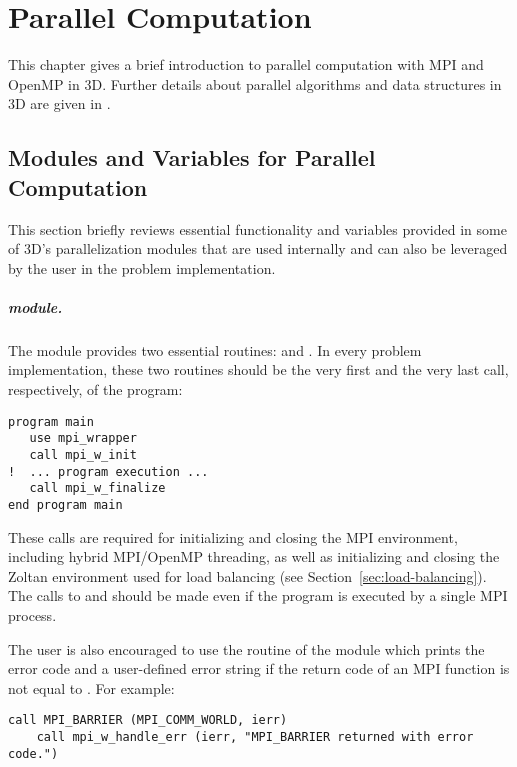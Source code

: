 %
%

\chapter{Parallel Computation}
\label{chap:parallel}


This chapter gives a brief introduction to parallel computation with MPI and OpenMP in \hp3D. Further details about parallel algorithms and data structures in \hp3D are given in \cite{hpbook3}.

\section{Modules and Variables for Parallel Computation}
\label{sec:mpi-modules}

This section briefly reviews essential functionality and variables provided in some of \hp3D's parallelization modules that are used internally and can also be leveraged by the user in the problem implementation.

\paragraph{ module.}
The  module provides two essential routines:  and . In every problem implementation, these two routines should be the very first and the very last call, respectively, of the program:
\begin{lstlisting}[caption=Initiating and finalizing \hp3D's MPI environment., label={lst:mpi_w_init}]
program main
   use mpi_wrapper 
   call mpi_w_init
!  ... program execution ...
   call mpi_w_finalize
end program main
\end{lstlisting}
These calls are required for initializing and closing the MPI environment, including hybrid MPI/OpenMP threading, as well as initializing and closing the Zoltan environment used for load balancing (see Section~\ref{sec:load-balancing}). The calls to  and  should be made even if the program is executed by a single MPI process. 

The user is also encouraged to use the  routine of the  module which prints the error code and a user-defined error string  if the return code  of an MPI function is not equal to . For example:
\begin{lstlisting}[caption=Checking and printing MPI error codes., label={lst:mpi_w_handle_error}]
	call MPI_BARRIER (MPI_COMM_WORLD, ierr)
	call mpi_w_handle_err (ierr, "MPI_BARRIER returned with error code.")
\end{lstlisting}

